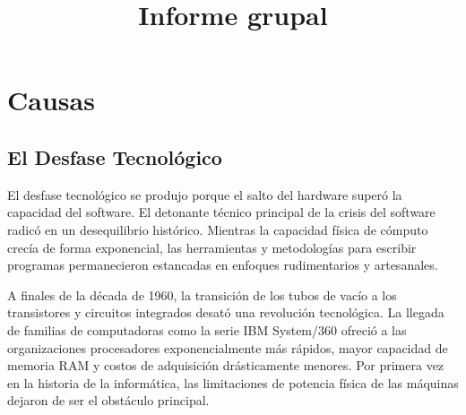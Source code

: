 \documentclass{./plantilla/umss}
\title{Informe grupal}
\begin{document}
\fairemarges
\fairepagedegarde

\section{Causas}

\subsection{El Desfase Tecnológico}

El desfase tecnológico se produjo porque el salto del hardware superó la capacidad del software. El detonante técnico principal de la crisis del software radicó en un desequilibrio histórico. Mientras la capacidad física de cómputo crecía de forma exponencial, las herramientas y metodologías para escribir programas permanecieron estancadas en enfoques rudimentarios y artesanales.

A finales de la década de 1960, la transición de los tubos de vacío a los transistores y circuitos integrados desató una revolución tecnológica. La llegada de familias de computadoras como la serie IBM System/360 ofreció a las organizaciones procesadores exponencialmente más rápidos, mayor capacidad de memoria RAM y costos de adquisición drásticamente menores. Por primera vez en la historia de la informática, las limitaciones de potencia física de las máquinas dejaron de ser el obstáculo principal.
\end{document}
